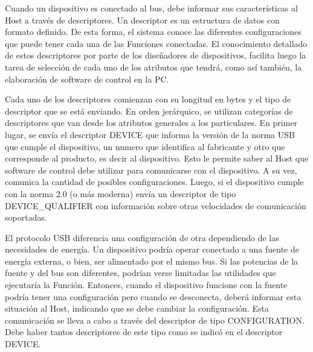 %

Cuando un dispositivo es conectado al bus, debe informar sus características al Host a través de descriptores. Un descriptor es un estructura de datos con formato definido. De esta forma, el sistema conoce las diferentes configuraciones que puede tener cada una de las Funciones conectadas. El conocimiento detallado de estos descriptores por parte de los diseñadores de dispositivos, facilita luego la tarea de selección de cada uno de los atributos que tendrá, como así también, la elaboración de software de control en la PC.%

Cada uno de los descriptores comienzan con su longitud en bytes y el tipo de descriptor que se está enviando. En orden jerárquico, se utilizan categorías de descriptores que van desde los atributos generales a los particulares. En primer lugar, se envía el descriptor DEVICE que informa la versión de la norma USB que cumple el dispositivo, un numero que identifica al fabricante y otro que corresponde al producto, es decir al dispositivo. Esto le permite saber al Host que software de control debe utilizar para comunicarse con el dispositivo. A su vez, comunica la cantidad de posibles configuraciones. Luego, si el dispositivo cumple con la norma 2.0 (o más moderna) envía un descriptor de tipo DEVICE\_QUALIFIER con información sobre otras velocidades de comunicación soportadas.%

El protocolo USB diferencia una configuración de otra dependiendo de las necesidades de energía. Un dispositivo podría operar conectado a una fuente de energía externa, o bien, ser alimentado por el mismo bus. Si las potencias de la fuente y del bus son diferentes, podrían verse limitadas las utilidades que ejecutaría la Función. Entonces, cuando el dispositivo funcione con la fuente podría tener una configuración pero cuando se desconecta, deberá informar esta situación al Host, indicando que se debe cambiar la configuración. Esta comunicación se lleva a cabo a través del descriptor de tipo CONFIGURATION. Debe haber tantos descriptores de este tipo como se indicó en el descriptor DEVICE.%

